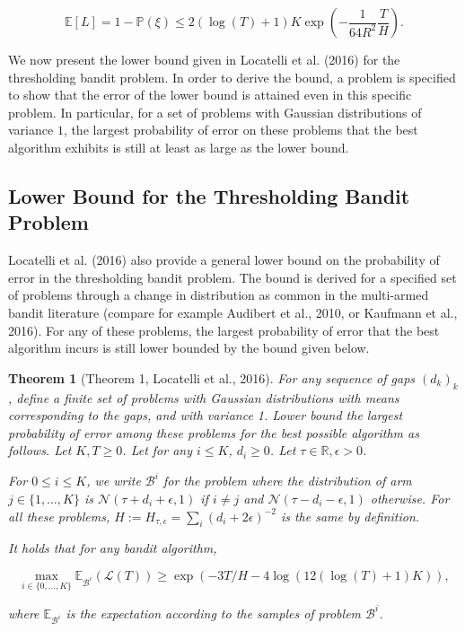 \documentclass[11pt,]{article}
\newtheorem{theorem}{Theorem}
\begin{document}
\[
\mathbb{E}[L] = 1 - \mathbb{P}(\xi) \leq 2(\log(T)+1)K \exp(-\frac{1}{64R^2}\frac{T}{H}).
\]

We now present the lower bound given in Locatelli et al. (2016) for the
thresholding bandit problem. In order to derive the bound, a problem is
specified to show that the error of the lower bound is attained even in
this specific problem. In particular, for a set of problems with
Gaussian distributions of variance \(1\), the largest probability of
error on these problems that the best algorithm exhibits is still at
least as large as the lower bound.

\subsection{\texorpdfstring{Lower Bound for the Thresholding Bandit
Problem
\label{sec:LowerBoundLocatelli}}{Lower Bound for the Thresholding Bandit Problem }}\label{lower-bound-for-the-thresholding-bandit-problem}

Locatelli et al. (2016) also provide a general lower bound on the
probability of error in the thresholding bandit problem. The bound is
derived for a specified set of problems through a change in distribution
as common in the multi-armed bandit literature (compare for example
Audibert et al., 2010, or Kaufmann et al., 2016). For any of these
problems, the largest probability of error that the best algorithm
incurs is still lower bounded by the bound given below.

\begin{theorem}[Theorem 1, Locatelli et al., 2016] 
\label{theorem:Locatelli2016Theorem1}
For any sequence of gaps $(d_k)_k$, define a finite set of problems with Gaussian distributions with means corresponding to the gaps, and with variance 1. Lower bound the largest probability of error among these problems for the best possible algorithm as follows. Let $K,T \geq 0$. Let for any $i \leq K$, $d_i \geq 0$. Let $\tau \in \mathbb{R}, \epsilon > 0$.

For $0 \leq i \leq K$, we write $\mathcal{B}^i$ for the problem where the distribution of arm $j \in \{1, \dots, K\}$ is $\mathcal{N}(\tau+d_i+\epsilon, 1)$ if $i \neq j$ and $\mathcal{N}(\tau-d_i-\epsilon, 1)$ otherwise. For all these problems, $H := H_{\tau, \epsilon} = \sum_i (d_i+2\epsilon)^{-2}$ is the same by definition.

It holds that for any bandit algorithm,

\begin{equation*}
\max_{i \in \{0, \dots, K\}} \mathbb{E}_{\mathcal{B}^i} (\mathcal{L}(T)) \geq \exp(-3T/H-4 \log(12(\log(T)+1)K)),
\end{equation*}

where $\mathbb{E}_{\mathcal{B}^i}$ is the expectation according to the samples of problem $\mathcal{B}^i$.
\end{theorem}
\end{document}
